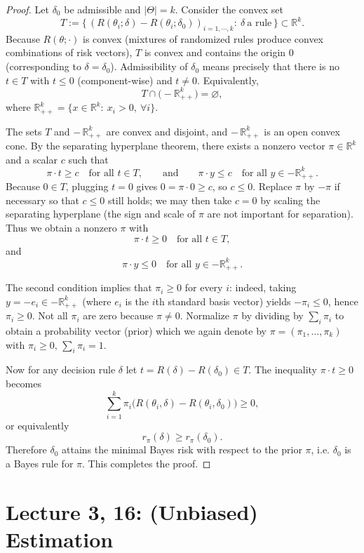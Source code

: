 \begin{proof}
Let $\delta_0$ be admissible and $|\Theta|=k$. Consider the convex set
\[
T := \{\,\left(R(\theta_i;\delta)-R(\theta_i;\delta_0)\right)_{i=1,\cdots,k}:\ \delta\ \text{a rule}\,\}\subset\mathbb{R}^k.
\]
Because $R(\theta;\cdot)$ is convex (mixtures of randomized rules produce convex combinations of risk vectors), $T$ is convex and contains the origin $0$ (corresponding to $\delta=\delta_0$). Admissibility of $\delta_0$ means precisely that there is no $t\in T$ with $t\le 0$ (component-wise) and $t\neq 0$. Equivalently,
\[
T\cap\big(-\mathbb{R}^k_{++}\big)=\varnothing,
\]
where $\mathbb{R}^k_{++}=\{x\in\mathbb{R}^k:\ x_i>0,\ \forall i\}$.

The sets $T$ and $-\,\mathbb{R}^k_{++}$ are convex and disjoint, and $-\,\mathbb{R}^k_{++}$ is an open convex cone. By the separating hyperplane theorem, there exists a nonzero vector $\pi\in\mathbb{R}^k$ and a scalar $c$ such that
\[
\pi\cdot t \ge c \quad\text{for all } t\in T,
\qquad\text{and}\qquad
\pi\cdot y \le c \quad\text{for all } y\in -\mathbb{R}^k_{++}.
\]
Because $0\in T$, plugging $t=0$ gives $0=\pi\cdot 0 \ge c$, so $c\le0$. Replace $\pi$ by $-\pi$ if necessary so that $c\le 0$ still holds; we may then take $c=0$ by scaling the separating hyperplane (the sign and scale of $\pi$ are not important for separation). Thus we obtain a nonzero $\pi$ with
\[
\pi\cdot t \ge 0 \quad\text{for all } t\in T,
\]
and
\[
\pi\cdot y \le 0 \quad\text{for all } y\in -\mathbb{R}^k_{++}.
\]

The second condition implies that $\pi_i\ge 0$ for every $i$: indeed, taking $y=-e_i\in -\mathbb{R}^k_{++}$ (where $e_i$ is the $i$th standard basis vector) yields $-\pi_i\le 0$, hence $\pi_i\ge0$. Not all $\pi_i$ are zero because $\pi\neq 0$. Normalize $\pi$ by dividing by $\sum_i\pi_i$ to obtain a probability vector (prior) which we again denote by $\pi=(\pi_1,\dots,\pi_k)$ with $\pi_i\ge0$, $\sum_i\pi_i=1$.

Now for any decision rule $\delta$ let $t=R(\delta)-R(\delta_0)\in T$. The inequality $\pi\cdot t\ge0$ becomes
\[
\sum_{i=1}^k \pi_i \big(R(\theta_i,\delta)-R(\theta_i,\delta_0)\big)\ge 0,
\]
or equivalently
\[
r_\pi(\delta)\ge r_\pi(\delta_0).
\]
Therefore $\delta_0$ attains the minimal Bayes risk with respect to the prior $\pi$, i.e. $\delta_0$ is a Bayes rule for $\pi$. This completes the proof.
\end{proof}




\section{Lecture 3, 16: (Unbiased) Estimation}
